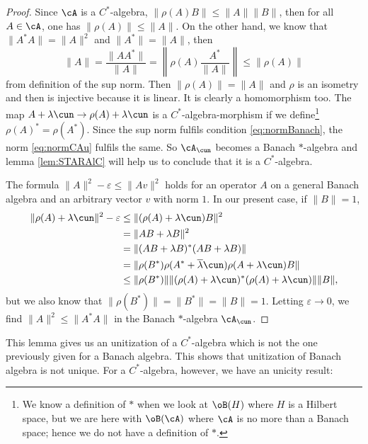 \begin{proof}
Since $\cA$ is a $C^*$-algebra, $\|\rho(A)B\|\leq\| A \|\|B\|$, then for all $A\in \cA$, one has $\| \rho(A) \|\leq \| A \|$. On the other hand, we know that $\| A^*A \|=\| A \|^2$ and $\| A^* \|=\| A \|$, then
\[ 
\| A \|=\frac{\| AA^* \|}{\| A \|}=\left\|  \rho(A)\frac{A^*}{\| A \|}  \right\|\leq\| \rho(A) \|
\]
from definition of the sup norm. Then $\| \rho(A) \|=\| A \|$ and $\rho$ is an isometry and then is injective because it is linear. It is clearly a homomorphism too. The map $A+\lambda\cun\to\rho(A)+\lambda\cun$ is a $C^*$-algebra-morphism if we define\footnote{We know a definition of $*$ when we look at $\oB(H)$ where $H$ is a Hilbert space, but we are here with $\oB(\cA)$ where $\cA$ is no more than a Banach space; hence we do not have a definition of $*$.} $\rho(A)^*=\rho(A^*)$.  Since the sup norm fulfils condition \eqref{eq:normBanach}, the norm \eqref{eq:normCAu} fulfils the same. So $\cA_{\cun}$ becomes a Banach $*$-algebra and lemma \ref{lem:STARAlC} will help us to conclude that it is a $C^*$-algebra.

The formula $\| A \|^2-\varepsilon\leq\| Av \|^2$ holds for an operator $A$ on a general Banach algebra and an arbitrary vector $v$ with norm $1$. In our present case, if $\| B \|=1$,
\begin{equation}
\begin{split}
  \| \rho(A)+\lambda\cun \|^2-\varepsilon 
        &\leq \| (\rho(A)+\lambda\cun)B \|^2\\
        &    =\| AB+\lambda B \|^2\\
        &    =\| (AB+\lambda B)^*(AB+\lambda B) \|\\
        &    =\| \rho(B^*)\rho(A^*+\overline{\lambda}\cun)\rho(A+\lambda\cun)B \|\\
        &\leq \| \rho(B^*) \|\| (\rho(A)+\lambda\cun)^*(\rho(A)+\lambda\cun) \|\| B \|,
\end{split}
\end{equation}
but we also know that $\| \rho(B^*) \|=\| B^* \|=\| B \|=1$. Letting $\varepsilon\to 0$, we find $\| A \|^2\leq\| A^*A \|$ in the Banach $*$-algebra $\cA_{\cun}$.

\end{proof}

\label{pg:unit_nonunic} This lemma gives us an unitization of a $C^*$-algebra which is not the one previously given for a Banach algebra. This shows that unitization of Banach algebra is not unique. For a $C^*$-algebra, however, we have an unicity result:

